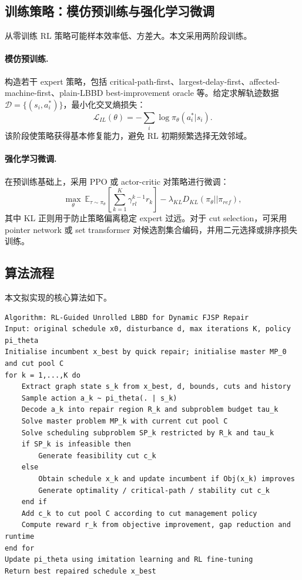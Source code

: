\documentclass[UTF8,12pt,a4paper]{ctexart}
\newcommand{\E}{\mathbb{E}}
\begin{document}
\subsection{训练策略：模仿预训练与强化学习微调}

从零训练 RL 策略可能样本效率低、方差大。本文采用两阶段训练。

\paragraph{模仿预训练.} 构造若干 expert 策略，包括 critical-path-first、largest-delay-first、affected-machine-first、plain-LBBD best-improvement oracle 等。给定求解轨迹数据 $\mathcal{D}=\{(s_i,a_i^*)\}$，最小化交叉熵损失：
\begin{equation}
    \mathcal{L}_{IL}(\theta)=-\sum_i\log \pi_\theta(a_i^*|s_i).
\end{equation}
该阶段使策略获得基本修复能力，避免 RL 初期频繁选择无效邻域。

\paragraph{强化学习微调.} 在预训练基础上，采用 PPO 或 actor-critic 对策略进行微调：
\begin{equation}
    \max_\theta\ \E_{\tau\sim\pi_\theta}\left[\sum_{k=1}^{K}\gamma_{rl}^{k-1}r_k\right]-\lambda_{KL}D_{KL}(\pi_\theta||\pi_{ref}),
\end{equation}
其中 KL 正则用于防止策略偏离稳定 expert 过远。对于 cut selection，可采用 pointer network 或 set transformer 对候选割集合编码，并用二元选择或排序损失训练。

\subsection{算法流程}

本文拟实现的核心算法如下。

\begin{lstlisting}[language={},basicstyle=\ttfamily\small,frame=single,breaklines=true]
Algorithm: RL-Guided Unrolled LBBD for Dynamic FJSP Repair
Input: original schedule x0, disturbance d, max iterations K, policy pi_theta
Initialise incumbent x_best by quick repair; initialise master MP_0 and cut pool C
for k = 1,...,K do
    Extract graph state s_k from x_best, d, bounds, cuts and history
    Sample action a_k ~ pi_theta(. | s_k)
    Decode a_k into repair region R_k and subproblem budget tau_k
    Solve master problem MP_k with current cut pool C
    Solve scheduling subproblem SP_k restricted by R_k and tau_k
    if SP_k is infeasible then
        Generate feasibility cut c_k
    else
        Obtain schedule x_k and update incumbent if Obj(x_k) improves
        Generate optimality / critical-path / stability cut c_k
    end if
    Add c_k to cut pool C according to cut management policy
    Compute reward r_k from objective improvement, gap reduction and runtime
end for
Update pi_theta using imitation learning and RL fine-tuning
Return best repaired schedule x_best
\end{lstlisting}
\end{document}
